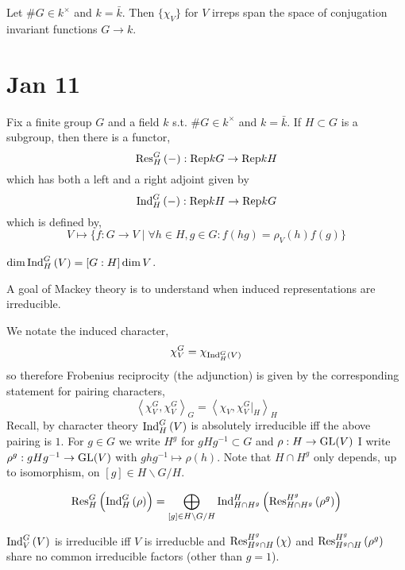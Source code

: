 \documentclass[12pt]{article}
\begin{document}
\begin{prop}
Let $\# G \in k^\times$ and $k = \bar{k}$. Then $\{ \chi_V \}$ for $V$ irreps span the space of conjugation invariant functions $G \to k$. 
\end{prop}

\section{Jan 11}

Fix a finite group $G$ and a field $k$ s.t. $\# G \in k^\times$ and $k = \bar{k}$. If $H \subset G$ is a subgroup, then there is a functor,
\[ \mathrm{Res}^{G}_{H} \left( - \right) : \mathrm{Rep}{k}{G} \to \mathrm{Rep}{k}{H} \]
which has both a left and a right adjoint given by 
\[ \mathrm{Ind}^{G}_{H} \left( - \right) : \mathrm{Rep}{k}{H} \to \mathrm{Rep}{k}{G} \]
which is defined by,
\[ V \mapsto \{ f : G \to V \mid \forall h \in H, g \in G : f(h g) = \rho_V(h) f(g) \} \]

\begin{rmk}
$\dim \mathrm{Ind}^{G}_{H} \left( V \right) = [G : H] \dim{V}$.
\end{rmk} 

\begin{rmk}
A goal of Mackey theory is to understand when induced representations are irreducible.
\end{rmk}

\newcommand{\inner}[2]{\left< #1, #2 \right>}

\begin{defn}
We notate the induced character,
\[ \chi^G_V = \chi_{\mathrm{Ind}^{G}_{H} \left( V \right)} \]
so therefore Frobenius reciprocity (the adjunction) is given by the corresponding statement for pairing characters,
\[ \inner{\chi_V^G}{\chi_V^G}_G = \inner{\chi_V}{\chi^G_V|_H}_H \]
Recall, by character theory $\mathrm{Ind}^{G}_{H} \left( V \right)$ is absolutely irreducible iff the above pairing is $1$.
For $g \in G$ we write $H^g$ for $g H g^{-1} \subset G$ and $\rho : H \to \mathrm{GL}(V)$ I write $\rho^g : g H g^{-1} \to \mathrm{GL}(V)$ with $g h g^{-1} \mapsto \rho(h)$. Note that $H \cap H^g$ only depends, up to isomorphism, on $[g] \in H \backslash G / H$.
\end{defn}

\begin{thm}
\[ \mathrm{Res}^{G}_{H} \left( \mathrm{Ind}^{G}_{H} \left( \rho \right) \right) = \bigoplus_{[g] \in H \backslash G / H} \mathrm{Ind}^{H}_{H \cap H^g} \left( \mathrm{Res}^{H^g}_{H \cap H^g} \left( \rho^g \right) \right) \]
\end{thm}

\begin{cor}
$\mathrm{Ind}^{G}_{V} \left( V \right)$ is irreducible iff $V$ is irreducble and $\mathrm{Res}^{H^g}_{H^g \cap H} \left( \chi \right)$ and $\mathrm{Res}^{H^g}_{H^g \cap H} \left( \rho^g \right)$ share no common irreducible factors (other than $g = 1$).
\end{cor}
\end{document}
